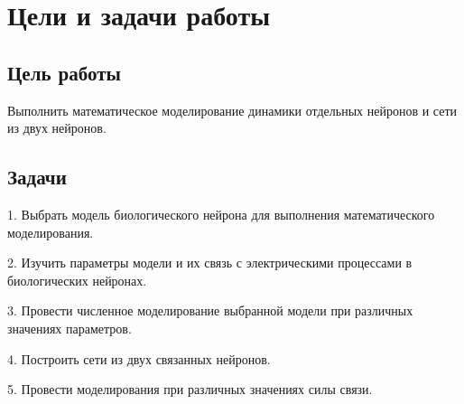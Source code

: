 \chapter{Цели и задачи работы}
\label{ch:chap1}

\section{Цель работы}

Выполнить математическое моделирование динамики отдельных нейронов и сети из двух нейронов.


\section{Задачи}

1. Выбрать модель биологического нейрона для выполнения математического моделирования.

2. Изучить параметры модели и их связь с электрическими процессами в биологических нейронах.

3. Провести численное моделирование выбранной модели при различных значениях параметров.

4. Построить сети из двух связанных нейронов.

5. Провести моделирования при различных значениях силы связи.




\endinput